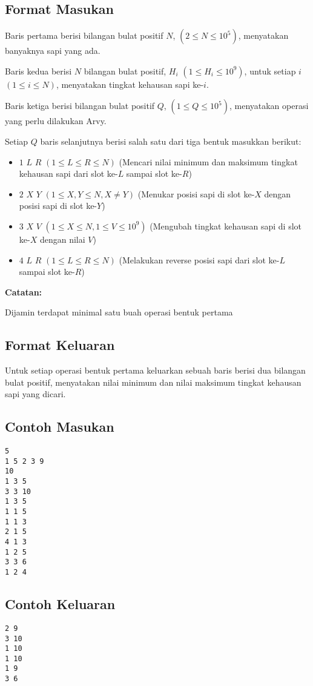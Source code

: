 \documentclass{article}
\begin{document}
\subsection*{Format Masukan}
Baris pertama berisi bilangan bulat positif $N$, $(2 \leq N \leq 10^5)$, menyatakan banyaknya sapi yang ada.

Baris kedua berisi $N$ bilangan bulat positif, $H_i$ $(1 \leq H_i \leq 10^9)$, untuk setiap $i$ $(1 \leq i \leq N)$, menyatakan tingkat kehausan sapi ke-$i$.

Baris ketiga berisi bilangan bulat positif $Q$, $(1 \leq Q \leq 10^5)$, menyatakan operasi yang perlu dilakukan Arvy.

Setiap $Q$ baris selanjutnya berisi salah satu dari tiga bentuk masukkan berikut:
\begin{itemize}
\item $1$ $L$ $R$ $(1 \leq L \leq R \leq N)$
(Mencari nilai minimum dan maksimum tingkat kehausan sapi dari slot ke-$L$ sampai slot ke-$R$)
\item $2$ $X$ $Y$ $(1 \leq X, Y \leq N, X \neq Y)$
(Menukar posisi sapi di slot ke-$X$ dengan posisi sapi di slot ke-$Y$)
\item $3$ $X$ $V$ $(1 \leq X \leq N, 1 \leq V \leq 10^9)$
(Mengubah tingkat kehausan sapi di slot ke-$X$ dengan nilai $V$)
\item $4$ $L$ $R$ $(1 \leq L \leq R \leq N)$
(Melakukan reverse posisi sapi dari slot ke-$L$ sampai slot ke-$R$)
\end{itemize}

\textbf{Catatan:}

Dijamin terdapat minimal satu buah operasi bentuk pertama

\subsection*{Format Keluaran}
Untuk setiap operasi bentuk pertama keluarkan sebuah baris berisi dua bilangan bulat positif, menyatakan nilai minimum dan nilai maksimum tingkat kehausan sapi yang dicari.

\pagebreak

\begin{multicols}{2}
\subsection*{Contoh Masukan}
\begin{lstlisting}
5
1 5 2 3 9
10
1 3 5
3 3 10
1 3 5
1 1 5
1 1 3
2 1 5
4 1 3
1 2 5
3 3 6
1 2 4

\end{lstlisting}
\columnbreak
\subsection*{Contoh Keluaran}
\begin{lstlisting}
2 9
3 10
1 10
1 10
1 9
3 6
\end{lstlisting}
\vfill
\null
\end{multicols}
\end{document}
